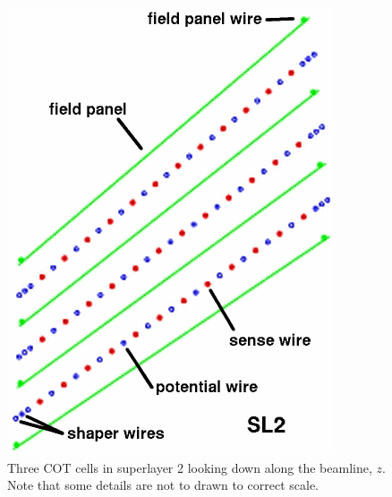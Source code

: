 \begin{figure}[htb!]
 \centering
 \includegraphics[keepaspectratio=true,scale=0.8]{./cot_cells.png}
 \caption{Three COT cells in superlayer 2 looking down along the beamline, $z$. Note that some details are not to drawn to correct scale.}
 \label{fig:COT_cells}
\end{figure}


